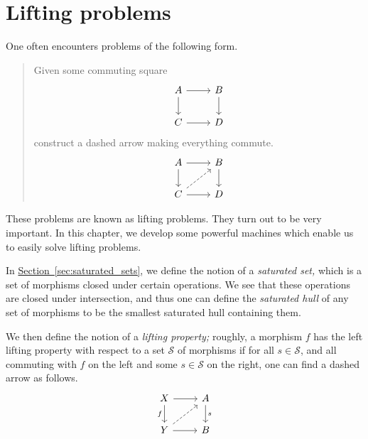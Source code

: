 \documentclass[main.tex]{subfiles}
\begin{document}
\chapter{Lifting problems}
\label{cha:lifting_problems}

One often encounters problems of the following form.
\begin{quote}
  Given some commuting square
  \begin{equation*}
    \begin{tikzcd}
      A
      \arrow[r]
      \arrow[d]
      & B
      \arrow[d]
      \\
      C
      \arrow[r]
      & D
    \end{tikzcd}
  \end{equation*}
  construct a dashed arrow making everything commute.
  \begin{equation*}
    \begin{tikzcd}
      A
      \arrow[r]
      \arrow[d]
      & B
      \arrow[d]
      \\
      C
      \arrow[ur, dashed]
      \arrow[r]
      & D
    \end{tikzcd}
  \end{equation*}
\end{quote}

These problems are known as lifting problems. They turn out to be very important. In this chapter, we develop some powerful machines which enable us to easily solve lifting problems.

In \hyperref[sec:saturated_sets]{Section~\ref*{sec:saturated_sets}}, we define the notion of a \emph{saturated set,} which is a set of morphisms closed under certain operations. We see that these operations are closed under intersection, and thus one can define the \emph{saturated hull} of any set of morphisms to be the smallest saturated hull containing them.

We then define the notion of a \emph{lifting property;} roughly, a morphism $f$ has the left lifting property with respect to a set $\mathcal{S}$ of morphisms if for all $s \in \mathcal{S}$, and all commuting with $f$ on the left and some $s \in \mathcal{S}$ on the right, one can find a dashed arrow as follows.
\begin{equation*}
  \begin{tikzcd}
    X
    \arrow[r]
    \arrow[d, swap, "f"]
    & A
    \arrow[d, "s"]
    \\
    Y
    \arrow[r]
    \arrow[ur, dashed]
    & B
  \end{tikzcd}
\end{equation*}
\end{document}
